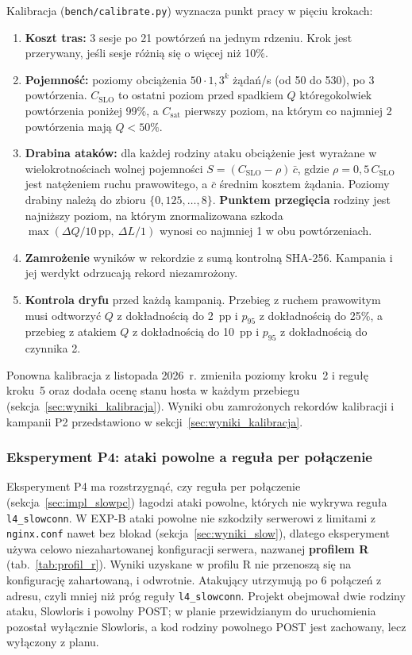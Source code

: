 \documentclass[a4paper,12pt]{article}
\begin{document}
Kalibracja (\texttt{bench/calibrate.py}) wyznacza punkt pracy w pięciu krokach:
\begin{enumerate}
    \item \textbf{Koszt tras:} 3 sesje po 21 powtórzeń na jednym rdzeniu. Krok jest przerywany, jeśli sesje różnią się o więcej niż 10\%.
    \item \textbf{Pojemność:} poziomy obciążenia $50 \cdot 1{,}3^k$ żądań/s (od 50 do 530), po 3 powtórzenia. $C_{\mathrm{SLO}}$ to ostatni poziom przed spadkiem $Q$ któregokolwiek powtórzenia poniżej 99\%, a $C_{\mathrm{sat}}$ pierwszy poziom, na którym co najmniej 2 powtórzenia mają $Q < 50\%$.
    \item \textbf{Drabina ataków:} dla każdej rodziny ataku obciążenie jest wyrażane w wielokrotnościach wolnej pojemności $S = (C_{\mathrm{SLO}} - \rho)\,\bar{c}$, gdzie $\rho = 0{,}5\,C_{\mathrm{SLO}}$ jest natężeniem ruchu prawowitego, a $\bar{c}$ średnim kosztem żądania. Poziomy drabiny należą do zbioru $\{0{,}125, \ldots, 8\}$. \textbf{Punktem przegięcia} rodziny jest najniższy poziom, na którym znormalizowana szkoda $\max(\Delta Q/10\,\mathrm{pp},\ \Delta L/1)$ wynosi co najmniej 1 w obu powtórzeniach.
    \item \textbf{Zamrożenie} wyników w rekordzie z sumą kontrolną SHA-256. Kampania i jej werdykt odrzucają rekord niezamrożony.
    \item \textbf{Kontrola dryfu} przed każdą kampanią. Przebieg z ruchem prawowitym musi odtworzyć $Q$ z dokładnością do 2~pp i $p_{95}$ z dokładnością do 25\%, a przebieg z atakiem $Q$ z dokładnością do 10~pp i $p_{95}$ z dokładnością do czynnika 2.
\end{enumerate}
Ponowna kalibracja z listopada 2026~r. zmieniła poziomy kroku~2 i regułę kroku~5 oraz dodała ocenę stanu hosta w każdym przebiegu (sekcja~\ref{sec:wyniki_kalibracja}). Wyniki obu zamrożonych rekordów kalibracji i kampanii P2 przedstawiono w sekcji~\ref{sec:wyniki_kalibracja}.

\subsubsection{Eksperyment P4: ataki powolne a reguła per połączenie}\label{sec:exp_p4}
Eksperyment P4 ma rozstrzygnąć, czy reguła per połączenie (sekcja~\ref{sec:impl_slowpc}) łagodzi ataki powolne, których nie wykrywa reguła \texttt{l4\_slowconn}. W EXP-B ataki powolne nie szkodziły serwerowi z limitami z \texttt{nginx.conf} nawet bez blokad (sekcja~\ref{sec:wyniki_slow}), dlatego eksperyment używa celowo niezahartowanej konfiguracji serwera, nazwanej \textbf{profilem R} (tab.~\ref{tab:profil_r}). Wyniki uzyskane w profilu R nie przenoszą się na konfigurację zahartowaną, i odwrotnie. Atakujący utrzymują po 6 połączeń z adresu, czyli mniej niż próg reguły \texttt{l4\_slowconn}. Projekt obejmował dwie rodziny ataku, Slowloris i powolny POST; w planie przewidzianym do uruchomienia pozostał wyłącznie Slowloris, a kod rodziny powolnego POST jest zachowany, lecz wyłączony z planu.
\end{document}

